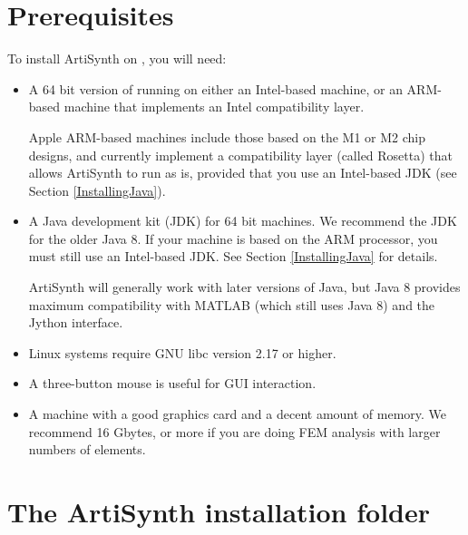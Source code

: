 \section{Prerequisites}
\label{Prerequisites}

To install ArtiSynth on \SYSTEM{}, you will need:

\begin{itemize}

\item A 64 bit version of \SYSTEM{} running on either an Intel-based
machine, or an ARM-based machine that implements an Intel
compatibility layer.

\ifMacOS
\begin{sideblock}
Apple ARM-based machines include those based on the M1 or M2 chip
designs, and currently implement a compatibility layer (called
Rosetta) that allows ArtiSynth to run as is, provided that you use an
Intel-based JDK (see Section \ref{InstallingJava}).
\end{sideblock}
\fi

\item A Java development kit (JDK) for 64 bit machines. We recommend
the JDK for the older Java 8. If your machine is based on the ARM
processor, you must still use an Intel-based JDK.  See Section
\ref{InstallingJava} for details.

\begin{sideblock}
ArtiSynth will generally work with later versions of Java, but Java 8
provides maximum compatibility with MATLAB (which still uses Java 8)
and the Jython interface.
\end{sideblock}

\ifLinux
\item Linux systems require GNU libc version 2.17 or higher.
\fi

\item A three-button mouse is useful for GUI interaction.

\item A machine with a good graphics card and a decent amount of
memory. We recommend 16 Gbytes, or more if you are doing FEM analysis
with larger numbers of elements.

\end{itemize}

\section{The ArtiSynth installation folder}
\label{FileConventions}

